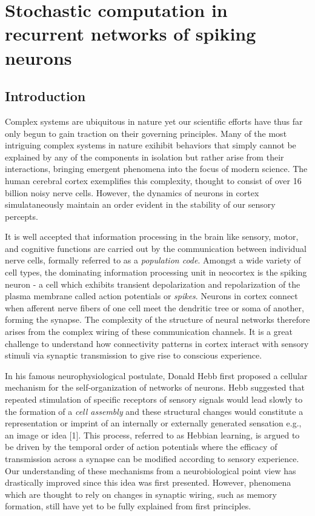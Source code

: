 \documentclass{ucetd}
\begin{document}
\mainmatter

\chapter{Stochastic computation in recurrent networks of spiking neurons}

\section{Introduction}

Complex systems are ubiquitous in nature yet our scientific efforts have thus far only begun to gain traction on their governing principles. Many of the most intriguing complex systems in nature exihibit behaviors that simply cannot be explained by any of the components in isolation but rather arise from their interactions, bringing emergent phenomena into the focus of modern science. The human cerebral cortex exemplifies this complexity, thought to consist of over 16 billion noisy nerve cells. However, the dynamics of neurons in cortex simulataneously maintain an order evident in the stability of our sensory percepts.

It is well accepted that information processing in the brain like sensory, motor, and cognitive functions are carried out by the communication between individual nerve cells, formally referred to as a \emph{population code}. Amongst a wide variety of cell types, the dominating information processing unit in neocortex is the spiking neuron - a  cell which exhibits transient depolarization and repolarization of the plasma membrane called action potentials or \emph{spikes}.  Neurons in cortex connect when afferent nerve fibers of one cell meet the dendritic tree or soma of another, forming the synapse. The complexity of the structure of neural networks therefore arises from the complex wiring of these communication channels. It is a great challenge to understand how connectivity patterns in cortex interact with sensory stimuli via synaptic transmission to give rise to conscious experience. 

In his famous neurophysiological postulate, Donald Hebb first proposed a cellular mechanism for the self-organization of networks of neurons. Hebb suggested that repeated stimulation of specific receptors of sensory signals would lead slowly to the formation of a \emph{cell assembly} and these structural changes would constitute a representation or imprint of an internally or externally generated sensation e.g., an image or idea [1]. This process, referred to as Hebbian learning, is argued to be driven by the temporal order of action potentials where the efficacy of transmission across a synapse can be modified according to sensory experience. Our understanding of these mechanisms from a neurobiological point view has drastically improved since this idea was first presented. However, phenomena which are thought to rely on changes in synaptic wiring, such as memory formation, still have yet to be fully explained from first principles.
\end{document}
